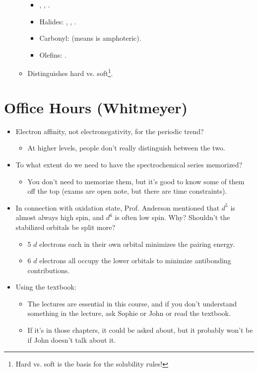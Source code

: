 \documentclass[../notes.tex]{subfiles}
\begin{document}
\begin{itemize}
\begin{itemize}
\begin{itemize}
            \item {}, , .
            \item Halides: , , .
            \item Carbonyl:  (means  is amphoteric).
            \item Olefins: .
        \end{itemize}
        \item Distinguishes hard vs. soft\footnote{Hard vs. soft is the basis for the solubility rules!}.
    \end{itemize}
\end{itemize}



\section{Office Hours (Whitmeyer)}
\begin{itemize}
    \item {}Electron affinity, not electronegativity, for the periodic trend?
    \begin{itemize}
        \item At higher levels, people don't really distinguish between the two.
    \end{itemize}
    \item To what extent do we need to have the spectrochemical series memorized?
    \begin{itemize}
        \item You don't need to memorize them, but it's good to know some of them off the top (exams are open note, but there are time constraints).
    \end{itemize}
    \item In connection with oxidation state, Prof. Anderson mentioned that $d^5$ is almost always high spin, and $d^6$ is often low spin. Why? Shouldn't the stabilized orbitals be split more?
    \begin{itemize}
        \item 5 $d$ electrons each in their own orbital minimizes the pairing energy.
        \item 6 $d$ electrons all occupy the lower orbitals to minimize antibonding contributions.
    \end{itemize}
    \item Using the textbook:
    \begin{itemize}
        \item The lectures are essential in this course, and if you don't understand something in the lecture, ask Sophie or John or read the textbook.
        \item If it's in those chapters, it could be asked about, but it probably won't be if John doesn't talk about it.
    \end{itemize}
\end{itemize}
\end{document}
